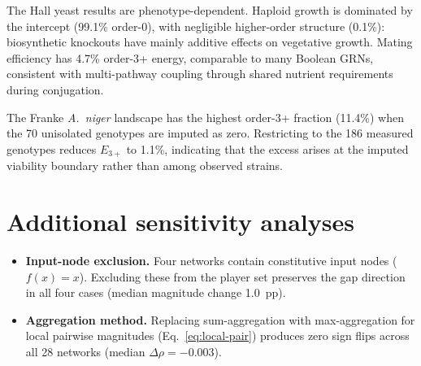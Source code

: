 \documentclass[10pt]{article}
\begin{document}
The Hall yeast results are phenotype-dependent. Haploid growth is
dominated by the intercept (99.1\% order-0), with negligible
higher-order structure (0.1\%): biosynthetic knockouts have mainly
additive effects on vegetative growth. Mating efficiency has 4.7\%
order-3+ energy, comparable to many Boolean GRNs, consistent with
multi-pathway coupling through shared nutrient requirements during
conjugation.

The Franke \emph{A.~niger} landscape has the highest order-3+
fraction (11.4\%) when the 70 unisolated genotypes are imputed as
zero. Restricting to the 186 measured genotypes reduces $E_{3+}$ to
1.1\%, indicating that the excess arises at the imputed viability
boundary rather than among observed strains.


\section{Additional sensitivity analyses}
\label{supp:sensitivity}

\begin{itemize}
\item \textbf{Input-node exclusion.} Four networks contain
  constitutive input nodes ($f(x) = x$). Excluding these from the
  player set preserves the gap direction in all four cases (median
  magnitude change 1.0~pp).
\item \textbf{Aggregation method.} Replacing sum-aggregation with
  max-aggregation for local pairwise magnitudes
  (Eq.~\ref{eq:local-pair}) produces zero sign flips across all 28
  networks (median $\Delta\rho = -0.003$).
\end{itemize}
\end{document}
